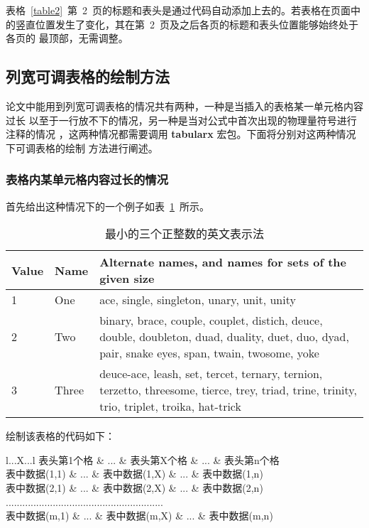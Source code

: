 表格~\ref{table2}~第~2~页的标题和表头是通过代码自动添加上去的。若表格在页面中
的竖直位置发生了变化，其在第~2~页及之后各页的标题和表头位置能够始终处于各页的
最顶部，无需调整。

\subsection{列宽可调表格的绘制方法}

论文中能用到列宽可调表格的情况共有两种，一种是当插入的表格某一单元格内容过长
以至于一行放不下的情况，另一种是当对公式中首次出现的物理量符号进行注释的情况
，这两种情况都需要调用 \textbf{tabularx} 宏包。下面将分别对这两种情况下可调表格的绘制
方法进行阐述。

\subsubsection{表格内某单元格内容过长的情况}

首先给出这种情况下的一个例子如表~\ref{table3}~所示。

\begin{table}[htbp]
\caption{最小的三个正整数的英文表示法}
\label{table3}
\begin{tabularx}{\textwidth}{llX}
\toprule
Value & Name & Alternate names, and names for sets of the given size\\
\midrule
1 & One & ace, single, singleton, unary, unit, unity\\
2 & Two & binary, brace, couple, couplet, distich, deuce, double, doubleton, duad, duality, duet, duo, dyad, pair, snake eyes, span, twain, twosome, yoke\\
3 & Three & deuce-ace, leash, set, tercet, ternary, ternion, terzetto, threesome, tierce, trey, triad, trine, trinity, trio, triplet, troika, hat-trick\\\bottomrule
\end{tabularx}
\end{table}

绘制该表格的代码如下：

\begin{code}
\begin{table}[htbp]
\caption{表格标题}
\label{标签名}
\begin{tabularx}{\textwidth}{l...X...l}
\toprule
表头第1个格   & ... & 表头第X个格   & ... & 表头第n个格  \\
\midrule
表中数据(1,1) & ... & 表中数据(1,X) & ... & 表中数据(1,n)\\
表中数据(2,1) & ... & 表中数据(2,X) & ... & 表中数据(2,n)\\
.........................................................\\
表中数据(m,1) & ... & 表中数据(m,X) & ... & 表中数据(m,n)\\
\bottomrule
\end{tabularx}
\end{table}
\end{code}

